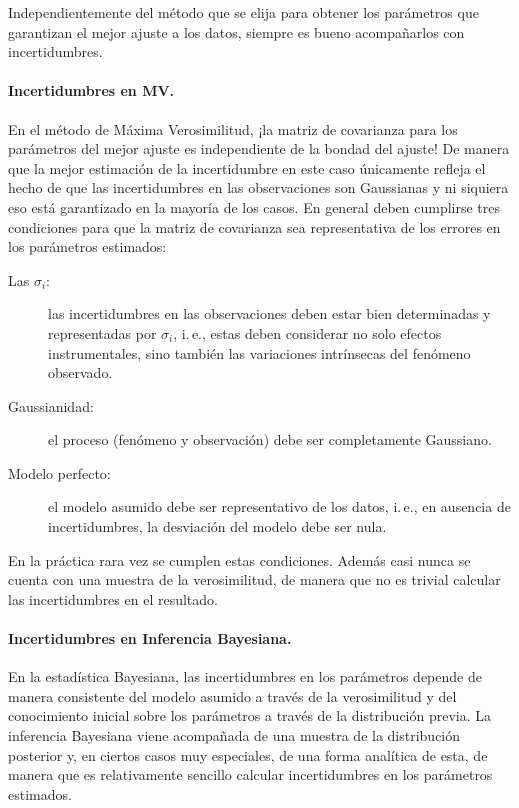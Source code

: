 \documentclass[a4paper,twoside]{article}
\begin{document}
Independientemente del método que se elija para obtener los parámetros que garantizan el mejor
ajuste a los datos, siempre es bueno acompañarlos con incertidumbres.

\paragraph{Incertidumbres en MV.} En el método de Máxima Verosimilitud, ¡la matriz de covarianza
para los parámetros del mejor ajuste es independiente de la bondad del ajuste! De manera que la
mejor estimación de la incertidumbre en este caso únicamente refleja el hecho de que las
incertidumbres en las observaciones son Gaussianas y ni siquiera eso está garantizado en la mayoría
de los casos. En general deben cumplirse tres condiciones para que la matriz de covarianza sea
representativa de los errores en los parámetros estimados:
%
\begin{description}
%
\item[Las $\sigma_i$:] las incertidumbres en las observaciones deben estar bien determinadas y
representadas por $\sigma_i$, i.\,e., estas deben considerar no solo efectos instrumentales, sino
también las variaciones intrínsecas del fenómeno observado.
%
\item[Gaussianidad:] el proceso (fenómeno y observación) debe ser completamente Gaussiano.
%
\item[Modelo perfecto:] el modelo asumido debe ser representativo de los datos, i.\,e., en ausencia
de incertidumbres, la desviación del modelo debe ser nula.
%
\end{description}
%
En la práctica rara vez se cumplen estas condiciones. Además casi nunca se cuenta con una muestra de
la verosimilitud, de manera que no es trivial calcular las incertidumbres en el resultado.

\paragraph{Incertidumbres en Inferencia Bayesiana.} En la estadística Bayesiana, las incertidumbres
en los parámetros depende de manera consistente del modelo asumido a través de la verosimilitud y
del conocimiento inicial sobre los parámetros a través de la distribución previa. La inferencia
Bayesiana viene acompañada de una muestra de la distribución posterior y, en ciertos casos muy
especiales, de una forma analítica de esta, de manera que es relativamente sencillo calcular
incertidumbres en los parámetros estimados.
\end{document}
